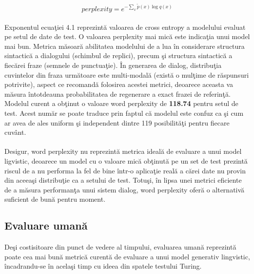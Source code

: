 \begin{equation}
perplexity = e^{-\sum_{x}\tilde{p}(x)\log{q(x)}}
\end{equation}

\paragraph{}
Exponentul ecua\c tiei 4.1 reprezint\u a valoarea de cross entropy a modelului evaluat pe setul de date de test. O valoarea perplexity mai mic\u a este indica\c tia unui model mai bun. Metrica m\u asoar\u a abilitatea modelului de a lua \^ in considerare structura sintactic\u a a dialogului (schimbul de replici), precum \c si structura sintactic\u a a fiec\u arei fraze (semnele de punctua\c tie). \^ In generarea de dialog, distribu\c tia cuvintelor din fraza urm\u atoare este multi-modal\u a (exist\u a o mul\c time de r\u aspunsuri potrivite), aspect ce recomand\u a folosirea acestei metrici, deoarece aceasta va m\u asura \^ intotdeauna probabilitatea de regenerare a exact frazei de referin\c t\u a. Modelul curent a ob\c tinut o valoare word perplexity de \textbf{118.74} pentru setul de test. Acest num\u ar se poate traduce prin faptul c\u a modelul este confuz ca \c si cum ar avea de ales uniform \c si independent dintre 119 posibilit\u a\c ti pentru fiecare cuv\^ ant.

\paragraph{}
Desigur, word perplexity nu reprezint\u a metrica ideal\u a de evaluare a unui model ligvistic, deoarece un model cu o valoare mic\u a ob\c tinut\u a pe un set de test prezint\u a riscul de a nu performa la fel de bine \^ intr-o aplica\c tie real\u a a c\u arei date nu provin din aceea\c si distribu\c tie ca a setului de test. Totu\c si, \^ in lipsa unei metrici eficiente de a m\u asura performan\c ta unui sistem dialog, word perplexity ofer\u a o alternativ\u a suficient de bun\u a pentru moment.

\subsection{Evaluare uman\u a}

\paragraph{}
De\c si costisitoare din punct de vedere al timpului, evaluarea uman\u a reprezint\u a poate cea mai bun\u a metric\u a curent\u a de evaluare a unui model generativ lingvistic, \^ incadrandu-se \^ in acela\c si timp cu ideea din spatele testului Turing. 

